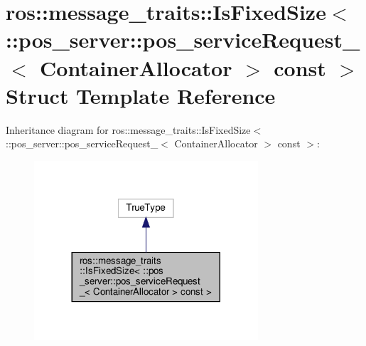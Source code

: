 \hypertarget{structros_1_1message__traits_1_1IsFixedSize_3_01_1_1pos__server_1_1pos__serviceRequest___3_01Conb601d728a746c044751e431d39ddeea2}{}\section{ros\+:\+:message\+\_\+traits\+:\+:Is\+Fixed\+Size$<$ \+:\+:pos\+\_\+server\+:\+:pos\+\_\+service\+Request\+\_\+$<$ Container\+Allocator $>$ const $>$ Struct Template Reference}
\label{structros_1_1message__traits_1_1IsFixedSize_3_01_1_1pos__server_1_1pos__serviceRequest___3_01Conb601d728a746c044751e431d39ddeea2}


Inheritance diagram for ros\+:\+:message\+\_\+traits\+:\+:Is\+Fixed\+Size$<$ \+:\+:pos\+\_\+server\+:\+:pos\+\_\+service\+Request\+\_\+$<$ Container\+Allocator $>$ const $>$\+:
\nopagebreak
\begin{figure}[H]
\begin{center}
\leavevmode
\includegraphics[width=236pt]{structros_1_1message__traits_1_1IsFixedSize_3_01_1_1pos__server_1_1pos__serviceRequest___3_01Con6b483c0b058ce6c2aa19bcef44ab9362}
\end{center}
\end{figure}


